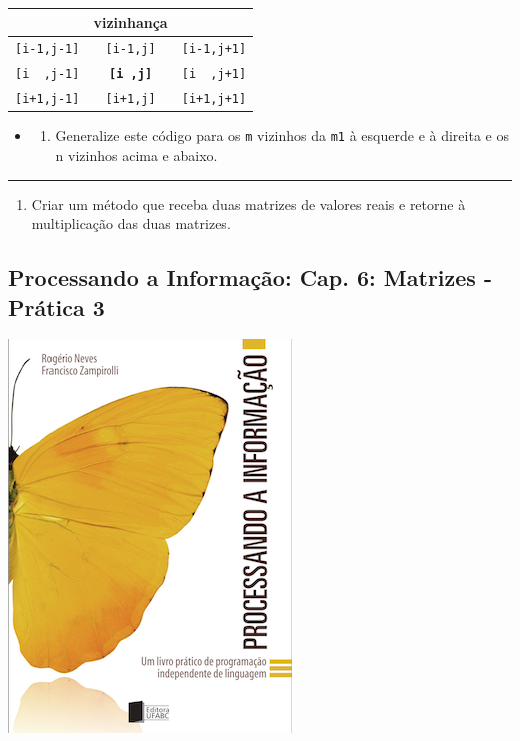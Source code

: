 \documentclass[12pt,a4paper]{article}
\providecommand{\tightlist}{%
      \setlength{\itemsep}{0pt}\setlength{\parskip}{0pt}}
\begin{document}
\begin{longtable}[]{@{}ccc@{}}
\toprule
& vizinhança &\tabularnewline
\midrule
\endhead
\texttt{{[}i-1,j-1{]}} & \texttt{{[}i-1,j{]}} &
\texttt{{[}i-1,j+1{]}}\tabularnewline
\texttt{{[}i\ \ ,j-1{]}} & \textbf{\texttt{{[}i\ ,j{]}}} &
\texttt{{[}i\ \ ,j+1{]}}\tabularnewline
\texttt{{[}i+1,j-1{]}} & \texttt{{[}i+1,j{]}} &
\texttt{{[}i+1,j+1{]}}\tabularnewline
\bottomrule
\end{longtable}

\begin{itemize}
\item
  \begin{enumerate}
  \def\labelenumi{\alph{enumi})}
  \setcounter{enumi}{1}
  \tightlist
  \item
    Generalize este código para os \texttt{m} vizinhos da \texttt{m1} à
    esquerde e à direita e os n vizinhos acima e abaixo.
  \end{enumerate}
\end{itemize}

    \begin{center}\rule{0.5\linewidth}{0.5pt}\end{center}

\begin{enumerate}
\def\labelenumi{\arabic{enumi}.}
\setcounter{enumi}{4}
\tightlist
\item
  Criar um método que receba duas matrizes de valores reais e retorne à
  multiplicação das duas matrizes.
\end{enumerate}

    \hypertarget{processando-a-informauxe7uxe3o-cap.-6-matrizes---pruxe1tica-3}{%
\subsection{Processando a Informação: Cap. 6: Matrizes - Prática
3}\label{processando-a-informauxe7uxe3o-cap.-6-matrizes---pruxe1tica-3}}

    \includegraphics{"figs/Capa_Processando_Informacao.jpg"}
\end{document}
